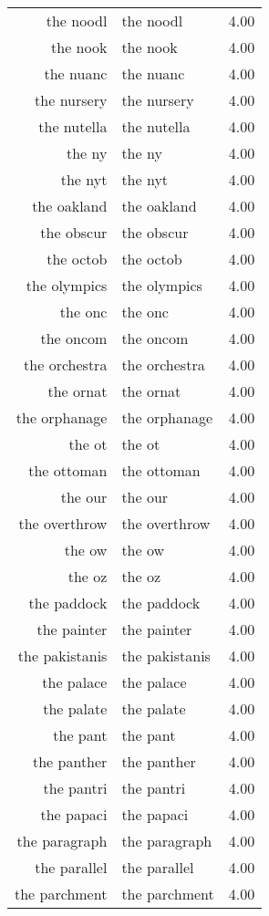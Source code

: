 \begin{table}[ht]
\begin{tabular}{rlr}
  the noodl & the noodl & 4.00 \\ 
  the nook & the nook & 4.00 \\ 
  the nuanc & the nuanc & 4.00 \\ 
  the nursery & the nursery & 4.00 \\ 
  the nutella & the nutella & 4.00 \\ 
  the ny & the ny & 4.00 \\ 
  the nyt & the nyt & 4.00 \\ 
  the oakland & the oakland & 4.00 \\ 
  the obscur & the obscur & 4.00 \\ 
  the octob & the octob & 4.00 \\ 
  the olympics & the olympics & 4.00 \\ 
  the onc & the onc & 4.00 \\ 
  the oncom & the oncom & 4.00 \\ 
  the orchestra & the orchestra & 4.00 \\ 
  the ornat & the ornat & 4.00 \\ 
  the orphanage & the orphanage & 4.00 \\ 
  the ot & the ot & 4.00 \\ 
  the ottoman & the ottoman & 4.00 \\ 
  the our & the our & 4.00 \\ 
  the overthrow & the overthrow & 4.00 \\ 
  the ow & the ow & 4.00 \\ 
  the oz & the oz & 4.00 \\ 
  the paddock & the paddock & 4.00 \\ 
  the painter & the painter & 4.00 \\ 
  the pakistanis & the pakistanis & 4.00 \\ 
  the palace & the palace & 4.00 \\ 
  the palate & the palate & 4.00 \\ 
  the pant & the pant & 4.00 \\ 
  the panther & the panther & 4.00 \\ 
  the pantri & the pantri & 4.00 \\ 
  the papaci & the papaci & 4.00 \\ 
  the paragraph & the paragraph & 4.00 \\ 
  the parallel & the parallel & 4.00 \\ 
  the parchment & the parchment & 4.00 \\ 

\end{tabular}
\end{table}
